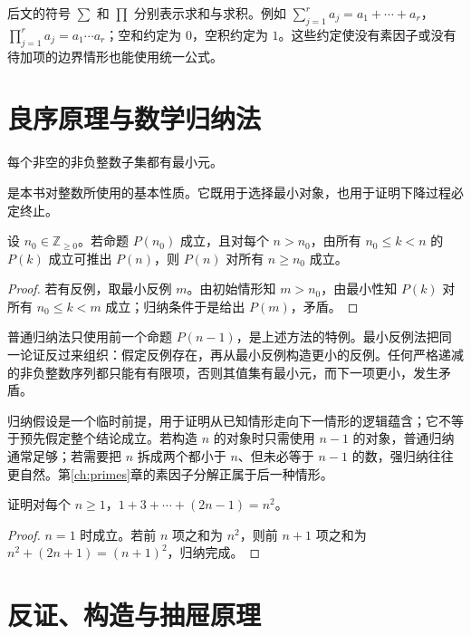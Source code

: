 \documentclass[UTF8,12pt,a4paper,fontset=fandol]{ctexbook}
\begin{document}
后文的符号 $\sum$ 和 $\prod$ 分别表示求和与求积。例如 $\sum_{j=1}^r a_j=a_1+\cdots+a_r$，$\prod_{j=1}^r a_j=a_1\cdots a_r$；空和约定为 $0$，空积约定为 $1$。这些约定使没有素因子或没有待加项的边界情形也能使用统一公式。

\section{良序原理与数学归纳法}

\begin{axiom}[良序原理]
每个非空的非负整数子集都有最小元。
\end{axiom}

是本书对整数所使用的基本性质。它既用于选择最小对象，也用于证明下降过程必定终止。

\begin{theorem}
设 $n_0\in\mathbb Z_{\ge0}$。若命题 $P(n_0)$ 成立，且对每个 $n>n_0$，由所有 $n_0\le k<n$ 的 $P(k)$ 成立可推出 $P(n)$，则 $P(n)$ 对所有 $n\ge n_0$ 成立。
\end{theorem}
\begin{proof}
若有反例，取最小反例 $m$。由初始情形知 $m>n_0$，由最小性知 $P(k)$ 对所有 $n_0\le k<m$ 成立；归纳条件于是给出 $P(m)$，矛盾。
\end{proof}

普通归纳法只使用前一个命题 $P(n-1)$，是上述方法的特例。最小反例法把同一论证反过来组织：假定反例存在，再从最小反例构造更小的反例。任何严格递减的非负整数序列都只能有有限项，否则其值集有最小元，而下一项更小，发生矛盾。

归纳假设是一个临时前提，用于证明从已知情形走向下一情形的逻辑蕴含；它不等于预先假定整个结论成立。若构造 $n$ 的对象时只需使用 $n-1$ 的对象，普通归纳通常足够；若需要把 $n$ 拆成两个都小于 $n$、但未必等于 $n-1$ 的数，强归纳往往更自然。第\ref{ch:primes}章的素因子分解正属于后一种情形。

\begin{example}
证明对每个 $n\ge1$，$1+3+\cdots+(2n-1)=n^2$。
\end{example}
\begin{proof}
$n=1$ 时成立。若前 $n$ 项之和为 $n^2$，则前 $n+1$ 项之和为 $n^2+(2n+1)=(n+1)^2$，归纳完成。
\end{proof}

\section{反证、构造与抽屉原理}
\end{document}
